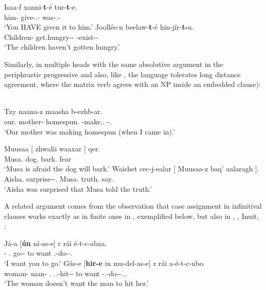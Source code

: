 \documentclass[output=paper]{langsci/langscibook}
\begin{document}
\ea%
    \label{ex:key:13.15} \parencite[99]{Baker2015}
	\ea
	\gll  Isaa-f xanni-\textbf{t}-é  tur-\textbf{t}-e.\\
	    him-\Dat{}  give-\Tsg.\Sbj{}-\Pst{}  was-\Tsg.\Sbj{}-\Pst{}\\
	\glt     ‘You HAVE given it to him.’
	\ex
	\gll  Joollée-n beelaw-\textbf{t}-é  hin-jír-\textbf{t-}u.\\
        Children-\Mnom{}  get.hungry-\glossF{}-\Pst{} \Neg{}-exist-\glossF{}-\Dep{}\\
	\glt     ‘The children haven’t gotten hungry.’
    \z
\z

Similarly, in  multiple heads  with the same
absolutive argument in the periphrastic progressive
\citep[71--72]{Baker2015} and also, like  \parencite{PolPot2001}, the
language tolerates long distance agreement, where the matrix verb agrees with an NP inside an embedded clause):

\ea%
    \label{ex:key:13.16} \citep[263]{Nichols2011}\\
    \gll  Txy naana-z maasha b-ezhb-ar.\\
            our.\Gen{}  mother-\Erg{}  homespun.\Bb{} \Bb{}-make.\Cvb.\Sim{} \Bb{}-\Prog.\Pst\\
    \glt  ‘Our mother was making homespun (when I came in).’
\z

\ea%
    \label{ex:key:13.17} \parencite[551, 550]{Nichols2011}
	\ea
	\gll  Muusaa  [ zhwalii waaxar ]  qer.\\
            Musa.\Abs{} {} dog.\Abs{}  bark.\Vn{} {} fear\\
	\glt     ‘Musa is afraid the dog will bark.’
	\ex
	\gll  Waishet cec-j-ealar  [ Muusaa-z baq’  aalaragh ].\\
            Aisha.\Abs{}  surprise-\Jj-\Lv{}.\Pst{} {}  Musa.\Erg{} truth.\Abs{}  say.\Vn{}.\Lat{} {}\\
	\glt     ‘Aisha was surprised that Musa told the truth.’
    \z
\z

A related argument comes from the observation that case assignment in
infinitival clauses works exactly as in finite ones in ,
exemplified below, but also in , , 
Inuit, :

\ea%
    \label{ex:key:13.18} \parencite[44]{Baker2015}
	\ea
	\gll   Já-a  [\textbf{ún}  ní-as-e]                r rái é-t-c-abaa.\\
	    \Fsg-\Erg{} \Ssg.\Abs{}  go-\Inf{}-\Obl{}  to want \Tsg.\Obj{}-do-\Npst-\Fsg{}.\Prs{}\\
	\glt     ‘I want you to go.’
	\ex
	\gll  Gús-e  [\textbf{hir-e}  in mu-del-as-e]                                     r rái a-é-t-c-ubo.\\
	    woman-\Erg{}  man-\Erg{}  \Tsg{}.\Abs{} \Third.\glossF{}.\Obj{}-hit-\Inf{}-\Obl{}  to want \Neg{}-\Tsg.\Obj{}-do-\Npst{}-\Third.\glossF.\Sbj{}.\Prs{}\\
	\glt     ‘The woman doesn’t want the man to hit her.’
    \z
\z
\end{document}
